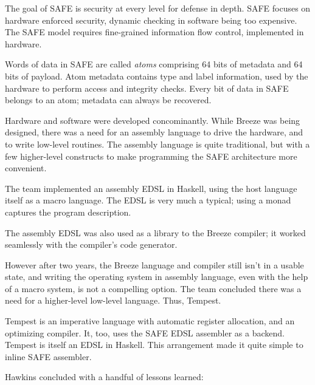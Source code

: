 \documentclass{jfp1}
\begin{document}
The goal of SAFE is security at every level for defense in depth.
SAFE focuses on hardware enforced security, dynamic checking
in software being too expensive. The SAFE model requires fine-grained
information flow control, implemented in hardware.

Words of data in SAFE are called \textit{atoms} comprising 64 bits of 
metadata and 64 bits of payload. Atom metadata contains type and
label information, used by the hardware to perform access and integrity
checks. Every bit of data in SAFE belongs to an atom; metadata can always
be recovered.

Hardware and software were developed concominantly. While Breeze was
being designed, there was a need for an assembly language to drive the 
hardware, and to write low-level routines. The assembly language is quite
traditional, but with a few higher-level constructs to make programming
the SAFE architecture more convenient.

The team implemented an assembly EDSL in Haskell, using the host
language itself as a macro language. The EDSL is very much a typical;
using a monad captures the program description. 

The assembly EDSL was also used as a library to the Breeze compiler;
it worked seamlessly with the compiler's code generator.

However after two years, the Breeze language and compiler still isn't in
a usable state, and writing the operating system in assembly language,
even with the help of a macro system, is not a compelling option. The
team concluded there was a need for a higher-level low-level language. Thus,
Tempest.

Tempest is an imperative language with automatic register allocation,
and an optimizing compiler. It, too, uses the SAFE EDSL assembler
as a backend. Tempest is itself an EDSL in Haskell. This arrangement
made it quite simple to inline SAFE assembler.

Hawkins concluded with a handful of lessons learned:
\end{document}
